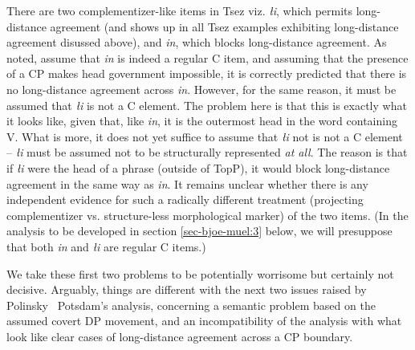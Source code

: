 \documentclass[output=paper
,modfonts
,nonflat]{langsci/langscibook}
\begin{document}
	
There are two comp\-lement\-izer-like items in Tsez viz. {\itshape {\l}i},
	which permits long-distance agreement (and shows up in all Tsez
	examples exhibiting long-distance agreement disussed above), and {\it
		\textcrlambda in}, which blocks long-distance agreement. As noted,
	\citet{PolinskyPotsdam:01} assume that {\itshape \textcrlambda in} is
	indeed a regular C item, and assuming that the presence of a CP makes
	head government impossible, it is correctly predicted that there is no
	long-distance agreement across {\itshape \textcrlambda in}.
	However,  for the same reason, it must be assumed that {\itshape {\l}i} is
	not a C element. The problem here is that this is exactly what
	it looks like, given that, like {\itshape \textcrlambda in}, it is the
	outermost head in the word containing V. What is more, it does not yet suffice to
	assume that  {\itshape {\l}i} not is not a C element -- {\itshape {\l}i} must  be
	assumed not to be structurally represented {\itshape at all}. The reason is
	that if {\itshape {\l}i} were the head of a phrase (outside of TopP), it would block
	long-distance agreement in the same way as {\itshape \textcrlambda in}. 
	It remains unclear whether there is any independent evidence for such
	a radically different treatment (projecting complementizer
	vs. structure-less morphological marker) of the two items. (In the
	analysis to be developed in section \ref{sec-bjoe-muel:3} below, we will presuppose that
	both  {\itshape \textcrlambda in} and {\itshape {\l}i} are regular C items.)
	
	We take these first two problems to be potentially worrisome but
	certainly not decisive. Arguably, things are different with the next
	two issues raised by Polinsky \ Potsdam's analysis, concerning a
	semantic problem based on the assumed covert DP movement, and an
	incompatibility of the analysis with what look like clear cases of
	long-distance agreement across a CP boundary.
	
	
	
\end{document}
